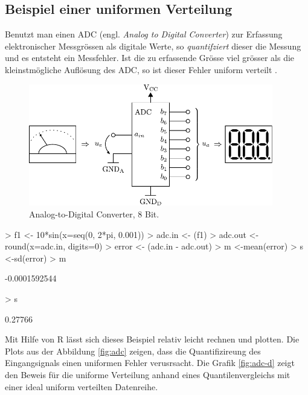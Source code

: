 \clearpage
\subsection{Beispiel einer uniformen Verteilung}
Benutzt man einen ADC (engl. \emph{Analog to Digital Converter}) zur 
Erfassung elektronischer Messgrössen als digitale Werte, so 
\emph{quantifziert} dieser die Messung und es entsteht ein Messfehler. 
Ist die zu erfassende Grösse viel grösser als die kleinstmögliche 
Auflösung des ADC, so ist dieser Fehler uniform verteilt 
\parencite[615]{taoe}.

\begin{figure}[h!]
	\centering
	\includegraphics[width=0.95\textwidth]{adc-system.pdf}
	\caption{Analog-to-Digital Converter, 8 Bit.}
\end{figure}

\begin{Schunk}
\begin{Sinput}
> f1 <- 10*sin(x=seq(0, 2*pi, 0.001))
> adc.in  <- (f1)
> adc.out <- round(x=adc.in, digits=0)
> error   <- (adc.in - adc.out)
> m <-mean(error)
> s <-sd(error)
> m
\end{Sinput}
\begin{Soutput}
[1] -0.0001592544
\end{Soutput}
\begin{Sinput}
> s
\end{Sinput}
\begin{Soutput}
[1] 0.27766
\end{Soutput}
\end{Schunk}

\noindent
Mit Hilfe von R lässt sich dieses Beispiel relativ leicht rechnen und
plotten. Die Plots aus der Abbildung \ref{fig:adc} zeigen, dass die 
Quantifizireung des Eingangsignals einen uniformen Fehler verusrsacht.
Die Grafik \ref{fig:adc-d} zeigt den Beweis für die uniforme Verteilung
anhand eines Quantilenvergleichs mit einer ideal uniform verteilten
Datenreihe.





